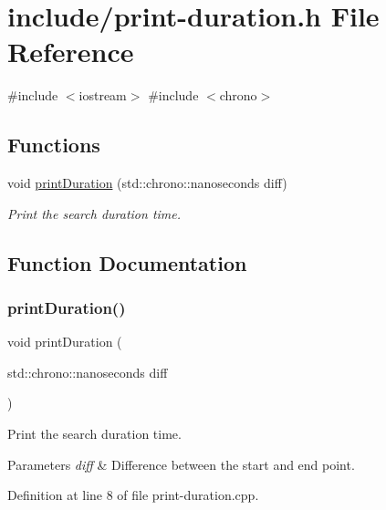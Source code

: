 \hypertarget{print-duration_8h}{}\section{include/print-\/duration.h File Reference}
\label{print-duration_8h}
{\ttfamily \#include $<$iostream$>$}\newline
{\ttfamily \#include $<$chrono$>$}\newline
\subsection*{Functions}
\begin{DoxyCompactItemize}
\item 
void \mbox{\hyperlink{print-duration_8h_a4c1e331c0cba77ad1ab6588631c69dd4}{print\+Duration}} (std\+::chrono\+::nanoseconds diff)
\begin{DoxyCompactList}\small\item\em Print the search duration time. \end{DoxyCompactList}\end{DoxyCompactItemize}


\subsection{Function Documentation}
\mbox{\label{print-duration_8h_a4c1e331c0cba77ad1ab6588631c69dd4}} 
\subsubsection{\texorpdfstring{printDuration()}{printDuration()}}
{\footnotesize\ttfamily void print\+Duration (\begin{DoxyParamCaption}\item[{std\+::chrono\+::nanoseconds}]{diff }\end{DoxyParamCaption})}



Print the search duration time. 


\begin{DoxyParams}{Parameters}
{\em diff} & Difference between the start and end point. \\
\hline
\end{DoxyParams}


Definition at line 8 of file print-\/duration.\+cpp.

